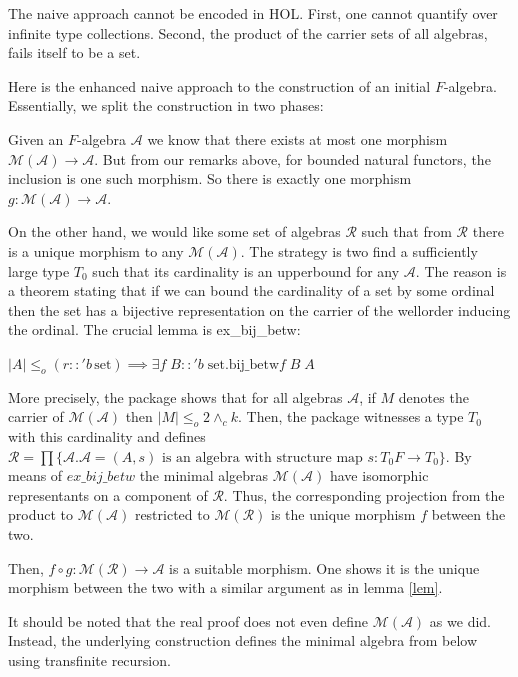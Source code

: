 The naive approach cannot be encoded in HOL. First, one cannot quantify over infinite type collections. Second, the product of the carrier sets of all algebras, fails itself to be a set. 

Here is the enhanced naive approach to the construction of an initial $F$-algebra. Essentially, we split the construction in two phases:

Given an $F$-algebra $\mathcal{A}$ we know that there exists at most one morphism $\mathcal{M}(\mathcal{A}) \to \mathcal{A}$. But from our remarks above, for bounded natural functors, the inclusion is one such morphism. So there is exactly one morphism $g: \mathcal{M}(\mathcal{A}) \to \mathcal{A}$.

On the other hand, we would like some set of algebras $\mathcal{R}$ such that from $\mathcal{R}$ there is a unique morphism to any $\mathcal{M}(\mathcal{A})$. The strategy is two find a sufficiently large type $T_0$ such that its cardinality is an upperbound for any $\mathcal{A}$. The reason is a theorem stating that if we can bound the cardinality of a set by some ordinal then the set has a bijective representation on the carrier of the wellorder inducing the ordinal. The crucial lemma is ex\_bij\_betw:

$|A| \le_o (r :: 'b \, \text{set}) \implies \exists f \; B::'b \; \text{set}. \text{bij\_betw} f \; B \; A$

More precisely, the package shows that for all algebras $\mathcal{A}$, if $M$ denotes the carrier of $\mathcal{M}(\mathcal{A})$ then $|M| \le_o 2  \wedge_c k$. Then, the package witnesses a type $T_0$ with this cardinality and defines $\mathcal{R} = \prod \{\mathcal{A}. \mathcal{A} = (A,s) \text{ is an algebra with structure map } s: T_0 F \to T_0 \}$. By means of $ex\_bij\_betw$ the minimal algebras $\mathcal{M}(\mathcal{A})$ have isomorphic representants on a component of $\mathcal{R}$. Thus, the corresponding projection from the product to $\mathcal{M}(\mathcal{A})$ restricted to $\mathcal{M}(\mathcal{R})$ is the unique morphism  $f$ between the two. 

Then, $f \circ g: \mathcal{M}(\mathcal{R}) \to \mathcal{A}$ is a suitable morphism. One shows it is the unique morphism between the two with a similar argument as in lemma \ref{lem}.

It should be noted that the real proof does not even define $\mathcal{M}(\mathcal{A})$ as we did. Instead, the underlying construction defines the minimal algebra from below using transfinite recursion.


